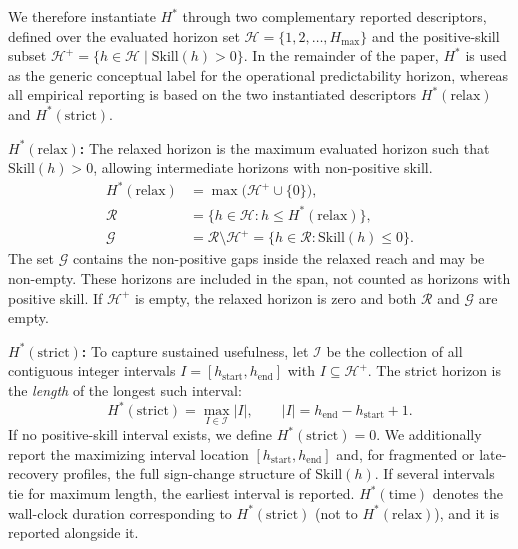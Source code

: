 \documentclass[pdflatex]{sn-jnl}
\begin{document}
We therefore instantiate $H^*$ through two complementary reported
descriptors, defined over the evaluated horizon set
$\mathcal{H} = \{1, 2, \dots, H_{\max}\}$ and the positive-skill
subset $\mathcal{H}^+ = \{h \in \mathcal{H} \mid \mathrm{Skill}(h) > 0\}$. In the remainder of the paper, $H^*$ is used as the generic conceptual label for the operational predictability horizon, whereas all empirical reporting is based on the two instantiated descriptors $H^*(\mathrm{relax})$ and $H^*(\mathrm{strict})$.



\textbf{$H^*(\mathrm{relax})$:} The relaxed horizon is the maximum
evaluated horizon such that $\mathrm{Skill}(h)>0$, allowing intermediate
horizons with non-positive skill.
\begin{equation}
\begin{aligned}
 H^*(\mathrm{relax}) &= \max\!\bigl(\mathcal{H}^+ \cup \{0\}\bigr),\\
 \mathcal{R} &= \{h\in\mathcal{H}:h\leq H^*(\mathrm{relax})\},\\
 \mathcal{G} &= \mathcal{R}\setminus\mathcal{H}^+
              = \{h\in\mathcal{R}:\mathrm{Skill}(h)\leq0\}.
\end{aligned}
\label{eq:relaxed_horizon}
\end{equation}
The set $\mathcal{G}$ contains the non-positive gaps inside the relaxed
reach and may be non-empty. These horizons are included in the span,
not counted as horizons with positive skill. If $\mathcal{H}^+$ is empty,
the relaxed horizon is zero and both $\mathcal{R}$ and $\mathcal{G}$ are empty.

\textbf{$H^*(\mathrm{strict})$:} To capture sustained usefulness, let
$\mathcal{I}$ be the collection of all contiguous integer intervals
$I=[h_{\mathrm{start}},h_{\mathrm{end}}]$ with $I\subseteq\mathcal{H}^+$.
The strict horizon is the \emph{length} of the longest such interval:
\begin{equation}
  H^*(\mathrm{strict}) = \max_{I\in\mathcal{I}} |I|,
  \qquad |I| = h_{\mathrm{end}} - h_{\mathrm{start}} + 1.
\end{equation}
If no positive-skill interval exists, we define
$H^*(\mathrm{strict})=0$. We additionally report the maximizing interval location
$[h_{\mathrm{start}}, h_{\mathrm{end}}]$ and, for fragmented or
late-recovery profiles, the full sign-change structure of
$\mathrm{Skill}(h)$. If several intervals tie for maximum length, the
earliest interval is reported. $H^*(\mathrm{time})$ denotes the wall-clock
duration corresponding to $H^*(\mathrm{strict})$ (not to
$H^*(\mathrm{relax})$), and it is reported alongside it.
\end{document}
